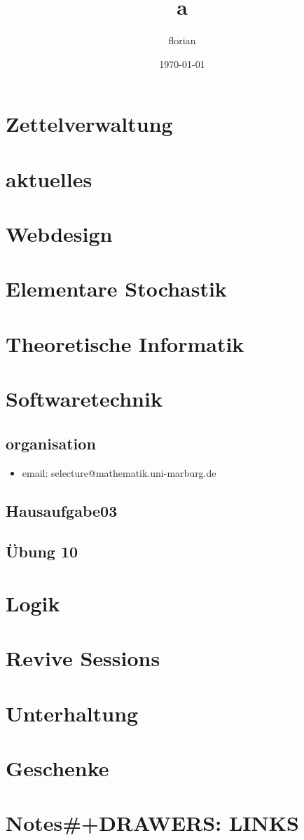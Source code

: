 \documentclass[11pt]{article}
\title{a}
\author{florian}
\date{\today}
\begin{document}
\maketitle

\setcounter{tocdepth}{3}
\tableofcontents
\vspace*{1cm}


\section{Zettelverwaltung}
\label{sec-1}
\section{aktuelles}
\label{sec-2}
\section{Webdesign}
\label{sec-3}
\section{Elementare Stochastik}
\label{sec-4}
\section{Theoretische Informatik}
\label{sec-5}
\section{Softwaretechnik}
\label{sec-6}
\subsection{organisation}
\label{sec-6-1}

\begin{itemize}
\item email: selecture@mathematik.uni-marburg.de
\end{itemize}
\subsection{Hausaufgabe03}
\label{sec-6-2}
\subsection{Übung 10}
\label{sec-6-3}
\section{Logik}
\label{sec-7}
\section{Revive Sessions}
\label{sec-8}
\section{Unterhaltung}
\label{sec-9}
\section{Geschenke}
\label{sec-10}
\section{Notes\#+DRAWERS: LINKS}
\label{sec-11}
\end{document}

